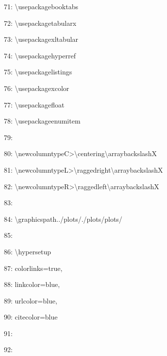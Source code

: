 \documentclass[11pt,a4paper]{article}
\begin{document}
71: \textbackslash{}usepackage{booktabs}

72: \textbackslash{}usepackage{tabularx}

73: \textbackslash{}usepackage{xltabular}

74: \textbackslash{}usepackage{hyperref}

75: \textbackslash{}usepackage{listings}

76: \textbackslash{}usepackage{xcolor}

77: \textbackslash{}usepackage{float}

78: \textbackslash{}usepackage{enumitem}

79:

80: \textbackslash{}newcolumntype{C}{>{\textbackslash{}centering\textbackslash{}arraybackslash}X}

81: \textbackslash{}newcolumntype{L}{>{\textbackslash{}raggedright\textbackslash{}arraybackslash}X}

82: \textbackslash{}newcolumntype{R}{>{\textbackslash{}raggedleft\textbackslash{}arraybackslash}X}

83:

84: \textbackslash{}graphicspath{{../plots/}{./plots/}{plots/}}

85:

86: \textbackslash{}hypersetup{

87:     colorlinks=true,

88:     linkcolor=blue,

89:     urlcolor=blue,

90:     citecolor=blue

91: }

92:
\end{document}
